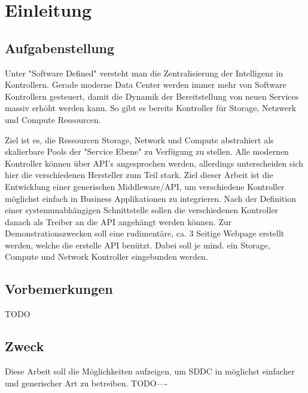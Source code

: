 
\chapter{Einleitung}
\section{Aufgabenstellung}
Unter "Software Defined" versteht man die Zentralisierung der Intelligenz in Kontrollern. 
Gerade moderne Data Center werden immer mehr von Software Kontrollern gesteuert, 
damit die Dynamik der Bereitstellung von neuen Services massiv erhöht werden kann. 
So gibt es bereits Kontroller für Storage, Netzwerk und Compute Ressourcen.

Ziel ist es, die Ressourcen Storage, Network und Compute abstrahiert als skalierbare 
Pools der "Service Ebene" zu Verfügung zu stellen. Alle modernen Kontroller können
 über API's angesprochen werden, allerdings unterscheiden sich hier die verschiedenen 
 Hersteller zum Teil stark.
Ziel dieser Arbeit ist die Entwicklung einer generischen Middleware/API, um verschiedene
 Kontroller möglichst einfach in Business Applikationen zu integrieren. Nach der Definition 
 einer systemunabhängigen Schnittstelle sollen die verschiedenen Kontroller danach als 
 Treiber an die API angehängt werden können. Zur Demonstrationszwecken soll eine rudimentäre, 
 ca. 3 Seitige Webpage erstellt werden, welche die erstelle 
API benützt. Dabei soll je mind. ein Storage, Compute und Network Kontroller eingebunden werden.

\section{Vorbemerkungen}
TODO
\section{Zweck}
Diese Arbeit soll die Möglichkeiten aufzeigen, um \ac{SDDC} in möglichst einfacher 
und generischer Art zu betreiben.
TODO----
